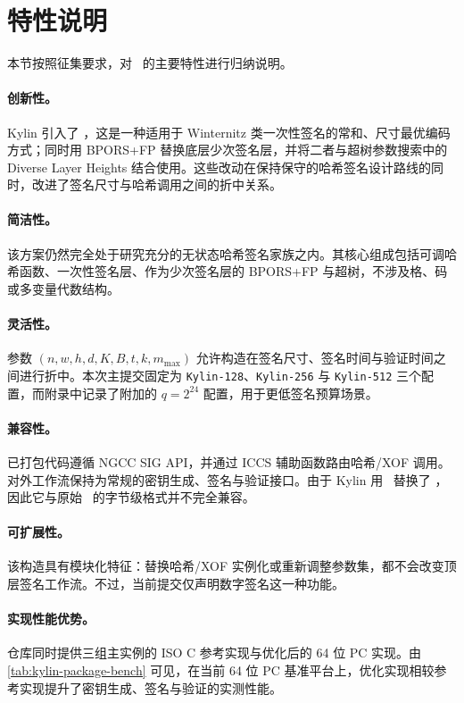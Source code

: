 \section{特性说明}
\label{sec:feature-statement}

本节按照征集要求，对 \SPHINCSA\ 的主要特性进行归纳说明。

\paragraph{创新性。}
Kylin 引入了 \WOTSCS，这是一种适用于 Winternitz 类一次性签名的常和、尺寸最优编码方式；同时用 BPORS+FP 替换底层少次签名层，并将二者与超树参数搜索中的 Diverse Layer Heights 结合使用。这些改动在保持保守的哈希签名设计路线的同时，改进了签名尺寸与哈希调用之间的折中关系。

\paragraph{简洁性。}
该方案仍然完全处于研究充分的无状态哈希签名家族之内。其核心组成包括可调哈希函数、一次性签名层、作为少次签名层的 BPORS+FP 与超树，不涉及格、码或多变量代数结构。

\paragraph{灵活性。}
参数 $(n,w,h,d,K,B,t,k,m_{\max})$ 允许构造在签名尺寸、签名时间与验证时间之间进行折中。本次主提交固定为 \texttt{Kylin-128}、\texttt{Kylin-256} 与 \texttt{Kylin-512} 三个配置，而附录中记录了附加的 $q=2^{24}$ 配置，用于更低签名预算场景。

\paragraph{兼容性。}
已打包代码遵循 NGCC SIG API，并通过 ICCS 辅助函数路由哈希/XOF 调用。对外工作流保持为常规的密钥生成、签名与验证接口。由于 Kylin 用 \WOTSCS\ 替换了 \WOTSP，因此它与原始 \SPHINCSP\ 的字节级格式并不完全兼容。

\paragraph{可扩展性。}
该构造具有模块化特征：替换哈希/XOF 实例化或重新调整参数集，都不会改变顶层签名工作流。不过，当前提交仅声明数字签名这一种功能。

\paragraph{实现性能优势。}
仓库同时提供三组主实例的 ISO C 参考实现与优化后的 64 位 PC 实现。由 \cref{tab:kylin-package-bench} 可见，在当前 64 位 PC 基准平台上，优化实现相较参考实现提升了密钥生成、签名与验证的实测性能。
